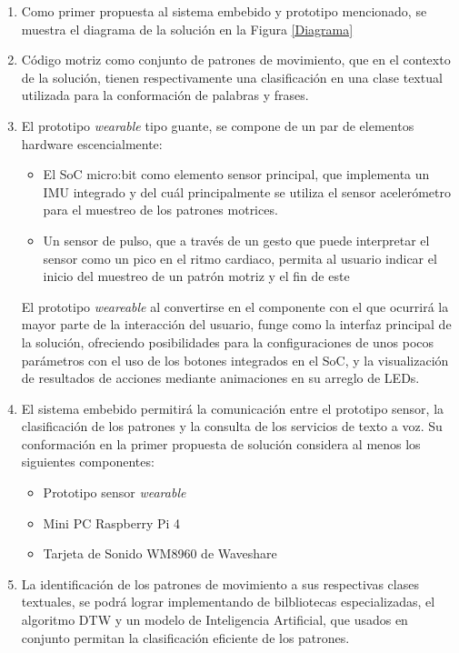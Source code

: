 \begin{enumerate}
	\item Como primer propuesta al sistema embebido y prototipo mencionado, se muestra el diagrama de la solución en la Figura \ref{Diagrama}
	
	\item Código motriz como conjunto de patrones de movimiento, que en el contexto de la solución, tienen respectivamente una clasificación en una clase textual utilizada para la conformación de palabras y frases.
	
	\item El prototipo \textit{wearable} tipo guante, se compone de un par de elementos hardware escencialmente:
		\begin{itemize}
			\item El SoC micro:bit como elemento sensor principal, que implementa un IMU integrado y del cuál principalmente se utiliza el sensor acelerómetro para el muestreo de los patrones motrices.
			\item Un sensor de pulso, que a través de un gesto que puede interpretar el sensor como un pico en el ritmo cardiaco, permita al usuario indicar el inicio del muestreo de un patrón motriz y el fin de este
		\end{itemize}
		El prototipo \textit{weareable} al convertirse en el componente con el que ocurrirá la mayor parte de la interacción del usuario, funge como la interfaz principal de la solución, ofreciendo posibilidades para la configuraciones de unos pocos parámetros con el uso de los botones integrados en el SoC, y la visualización de resultados de acciones mediante animaciones en su arreglo de LEDs.
	
	\item El sistema embebido permitirá la comunicación entre el prototipo sensor, la clasificación de los patrones y la consulta de los servicios de texto a voz. Su conformación en la primer propuesta de solución considera al menos los siguientes componentes:
	\begin{itemize}
		\item Prototipo sensor \textit{wearable}
		\item Mini PC Raspberry Pi 4
		\item Tarjeta de Sonido WM8960 de Waveshare
	\end{itemize}
	
	\item La identificación de los patrones de movimiento a sus respectivas clases textuales, se podrá lograr implementando de bilbliotecas especializadas, el algoritmo DTW y un modelo de Inteligencia Artificial, que usados en conjunto permitan la clasificación eficiente de los patrones.
	

\end{enumerate}
